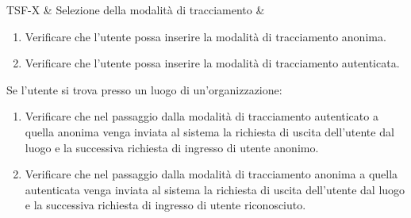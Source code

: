 
TSF-X & Selezione della modalità di tracciamento & \begin{enumerate}
    \item Verificare che l'utente possa inserire la modalità di tracciamento anonima.
    \item Verificare che l'utente possa inserire la modalità di tracciamento autenticata.
\end{enumerate}
Se l'utente si trova presso un luogo di un'organizzazione:
\begin{enumerate}
    \item Verificare che nel passaggio dalla modalità di tracciamento autenticato a quella anonima venga inviata al sistema la richiesta di uscita dell'utente dal luogo e la successiva richiesta di ingresso di utente anonimo.
    \item Verificare che nel passaggio dalla modalità di tracciamento anonima a quella autenticata venga inviata al sistema la richiesta di uscita dell'utente dal luogo e la successiva richiesta di ingresso di utente riconosciuto.
\end{enumerate} \\

